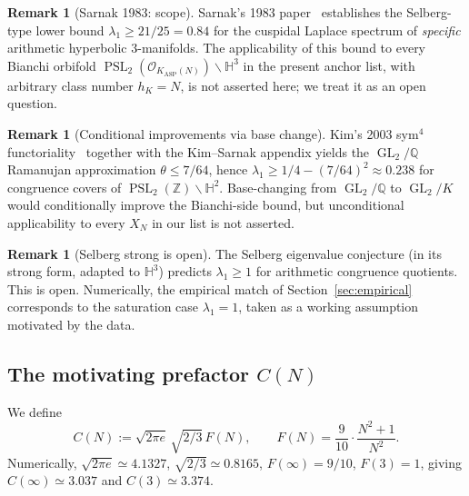 \documentclass[11pt,a4paper]{article}
\theoremstyle{definition}
\newtheorem{remark}[theorem]{Remark}
\DeclareMathOperator{\PSL}{PSL}
\DeclareMathOperator{\GL}{GL}
\newcommand{\KASP}{K_{\mathrm{ASP}}}
\newcommand{\HH}{\mathbb{H}}
\newcommand{\ZZ}{\mathbb{Z}}
\newcommand{\QQ}{\mathbb{Q}}
\begin{document}
\begin{remark}[Sarnak 1983: scope]\label{rem:Sarnak}
Sarnak's 1983 paper~\cite{Sarnak1983} establishes the Selberg-type lower
bound $\lambda_1 \geq 21/25 = 0.84$ for the cuspidal Laplace spectrum of
\emph{specific} arithmetic hyperbolic $3$-manifolds. The applicability of
this bound to every Bianchi orbifold
$\PSL_2(\mathcal{O}_{\KASP(N)})\backslash\HH^3$ in the present anchor list,
with arbitrary class number $h_K = N$, is not asserted here; we treat it
as an open question.
\end{remark}

\begin{remark}[Conditional improvements via base change]
Kim's 2003 sym$^4$ functoriality~\cite{Kim2003} together with the
Kim--Sarnak appendix yields the $\GL_2/\QQ$ Ramanujan approximation
$\theta \leq 7/64$, hence $\lambda_1 \geq 1/4 - (7/64)^2 \approx 0.238$
for congruence covers of $\PSL_2(\ZZ)\backslash\HH^2$. Base-changing from
$\GL_2/\QQ$ to $\GL_2/K$ would conditionally improve the Bianchi-side
bound, but unconditional applicability to every $X_N$ in our list is not
asserted.
\end{remark}

\begin{remark}[Selberg strong is open]
The Selberg eigenvalue conjecture (in its strong form, adapted to $\HH^3$)
predicts $\lambda_1 \geq 1$ for arithmetic congruence quotients. This is
open. Numerically, the empirical match of Section~\ref{sec:empirical}
corresponds to the saturation case $\lambda_1 = 1$, taken as a working
assumption motivated by the data.
\end{remark}

\subsection{The motivating prefactor $C(N)$}\label{ssec:prefactor}

We define
\begin{equation}\label{eq:CN}
  C(N) := \sqrt{2\pi e}\,\sqrt{2/3}\,F(N),
  \qquad F(N) = \frac{9}{10}\cdot\frac{N^2+1}{N^2}.
\end{equation}
Numerically, $\sqrt{2\pi e} \simeq 4.1327$, $\sqrt{2/3} \simeq 0.8165$,
$F(\infty) = 9/10$, $F(3) = 1$, giving $C(\infty)\simeq 3.037$ and
$C(3)\simeq 3.374$.
\end{document}
